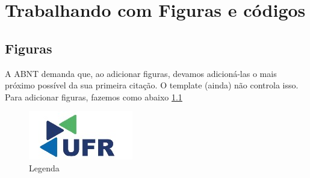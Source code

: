 \chapter{Trabalhando com Figuras e códigos}


\section{Figuras}

A ABNT demanda que, ao adicionar figuras, devamos adicioná-las o mais próximo possível da sua primeira citação. O template (ainda) não controla isso. Para adicionar figuras, fazemos como abaixo \ref{fig:figura-logo}

\begin{figure}
    \centering
    \includegraphics{ufr/images/logo.jpeg} %
    \caption{Legenda}
    \label{fig:figura-logo}
\end{figure}

